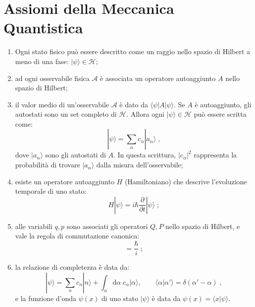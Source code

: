 \documentclass[10pt,a4paper]{report}
\theoremstyle{definition}
\newcommand{\ham}{\mathcal{H}}
\numberwithin{equation}{section}
\newcommand{\diff}[1][]{\mathrm{d}#1}
\newcommand{\bra}{\langle}
\newcommand{\ket}{\rangle}
\begin{document}
\section{Assiomi della Meccanica Quantistica}
\begin{enumerate}
\item Ogni stato fisico può essere descritto come un raggio nello spazio di Hilbert a meno di una fase: $|\psi\ket\in\ham$;
\item ad ogni osservabile fisica $\mathcal{A}$ è associata un operatore autoaggiunto $A$ nello spazio di Hilbert;
\item il valor medio di un'osservabile $\mathcal{A}$ è dato da $\bra\psi|A|\psi\ket$. Se $A$ è autoaggiunto, gli autostati sono un set completo di $\ham$. Allora ogni $|\psi\ket\in\ham$ può essere scritta come:
\begin{equation}
|\psi\ket=\sum_{\alpha}c_{\alpha}|a_{\alpha}\ket\;,
\end{equation}
dove $|a_{\alpha}\ket$ sono gli autostati di $A$. In questa scrittura, $|c_{\alpha}|^2$ rappresenta la probabilità di trovare $|a_{\alpha}\ket$ dalla misura dell'osservabile;
\item esiste un operatore autoaggiunto $H$ (Hamiltoniano) che descrive l'evoluzione temporale di uno stato:
\begin{equation}
H|\psi\ket=i\hbar\frac{\partial}{\partial t}|\psi\ket\;;
\end{equation}
\item alle variabili $q,p$ sono associati gli operatori $Q,P$ nello spazio di Hilbert, e vale la regola di commutazione canonica:
\begin{equation}
[P,Q]=\frac{\hbar}{i}\;;
\end{equation}
\item la relazione di completezza è data da:
\begin{equation}
|\psi\ket=\sum_n c_n|n\ket+\int_{\alpha}\diff{\alpha}\; c_{\alpha}|\alpha\ket, \qquad \bra\alpha|\alpha'\ket=\delta(\alpha'-\alpha)\;,
\end{equation}
e la funzione d'onda $\psi(x)$ di uno stato $|\psi\ket$ è data da $\psi(x)=\bra x|\psi\ket$.
\end{enumerate}
\end{document}
